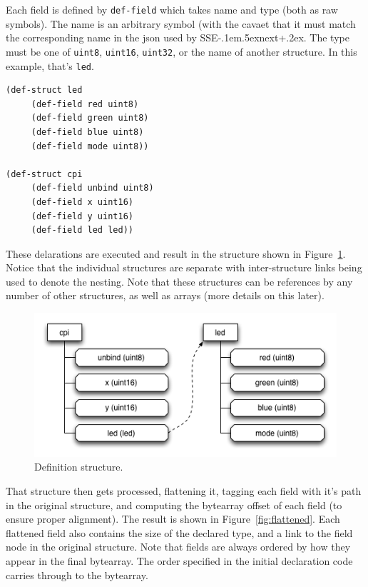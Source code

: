\documentclass[12pt]{article}
\def\SSEnext{SSE\kern-.1em\lower.5ex\hbox{\footnotesize next}\kern+.2ex}
\begin{document}
Each field is defined by \verb|def-field| which takes name and type
(both as raw symbols). The name is an arbitrary symbol (with the
cavaet that it must match the corresponding name in the json used by
\SSEnext. The type must be one of \verb|uint8|, \verb|uint16|,
\verb|uint32|, or the name of another structure. In this example,
that's \verb|led|.

\begin{verbatim}
(def-struct led
     (def-field red uint8)
     (def-field green uint8)
     (def-field blue uint8)
     (def-field mode uint8))

(def-struct cpi
     (def-field unbind uint8)
     (def-field x uint16)
     (def-field y uint16)
     (def-field led led))
\end{verbatim}

These delarations are executed and result in the structure shown in
Figure~\ref{fig:defstructure}. Notice that the individual structures
are separate with inter-structure links being used to denote the
nesting. Note that these structures can be references by any number of
other structures, as well as arrays (more details on this later).

\begin{figure}[htbp] %
   \centering
   \includegraphics[width=5in]{def_structure.png} 
\caption{Definition structure.}
\label{fig:defstructure}
\end{figure}

That structure then gets processed, flattening it, tagging each field
with it's path in the original structure, and computing the bytearray
offset of each field (to ensure proper alignment). The result is shown
in Figure~\ref{fig:flattened}. Each flattened field also contains the
size of the declared type, and a link to the field node in the
original structure. Note that fields are always ordered by how they
appear in the final bytearray. The order specified in the initial
declaration code carries through to the bytearray.
\end{document}
